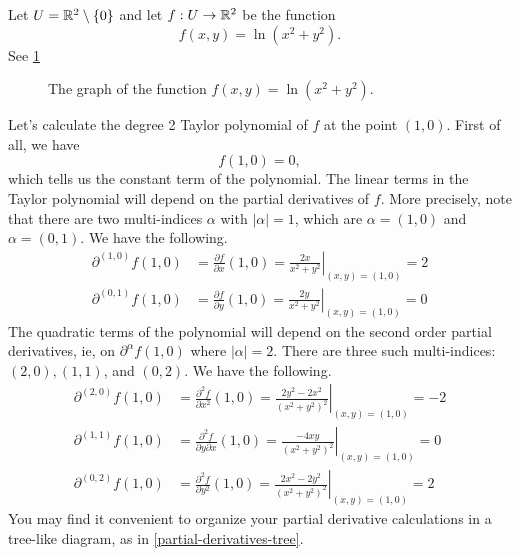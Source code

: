 \begin{example} \label{taylor-example}
	Let $U = \mathbb{R}^2 \setminus \{0\}$ and let $f : U \to \mathbb{R}^2$ be the function \[ f(x,y) = \ln(x^2 + y^2). \]
	See \cref{taylor-example-graph}
	\begin{figure}[ht]
		\begin{center}
		\end{center}
		\caption{The graph of the function  $f(x,y) = \ln(x^2 + y^2)$. } \label{taylor-example-graph}
	\end{figure}
	
	Let's calculate the degree 2 Taylor polynomial of $f$ at the point $(1,0)$. First of all, we have \[ f(1,0) = 0, \] which tells us the constant term of the polynomial. The linear terms in the Taylor polynomial will depend on the partial derivatives of $f$. More precisely, note that there are two multi-indices $\alpha$ with $|\alpha| = 1$, which are $\alpha = (1,0)$ and $\alpha = (0,1)$. We have the following.  
	\[ \begin{aligned} \partial^{(1,0)}f(1,0) &= \frac{\partial f}{\partial x}(1,0) = \left.\frac{2x}{x^2 + y^2}\right|_{(x,y) = (1,0)} = 2 \\
	 \partial^{(0,1)}f(1,0) &= \frac{\partial f}{\partial y}(1,0) = \left.\frac{2y}{x^2 + y^2}\right|_{(x,y) = (1,0)} = 0 \end{aligned} \]
	The quadratic terms of the polynomial will depend on the second order partial derivatives, ie, on $\partial^\alpha f(1,0)$ where $|\alpha| = 2$. There are three such multi-indices: $(2,0), (1,1)$, and $(0,2)$. We have the following. 
	\[ \begin{aligned} \partial^{(2,0)}f(1,0) &= \left.\frac{\partial^2 f}{\partial x^2}(1,0) = \frac{2y^2 - 2x^2}{(x^2 + y^2)^2}\right|_{(x,y) = (1,0)} = -2 \\
	\partial^{(1,1)}f(1,0) &= \frac{\partial^2 f}{\partial y \partial x}(1,0) = \left.\frac{-4xy}{(x^2 + y^2)^2}\right|_{(x,y) = (1,0)} = 0 \\
	\partial^{(0,2)}f(1,0) &= \frac{\partial^2 f}{\partial y^2}(1,0) = \left.\frac{2x^2 - 2y^2}{(x^2 + y^2)^2}\right|_{(x,y) = (1,0)} = 2 \end{aligned} \]
	You may find it convenient to organize your partial derivative calculations in a tree-like diagram, as in \cref{partial-derivatives-tree}. 
	\begin{figure}
		\begin{center}
\end{center}
\end{figure}
\end{example}
